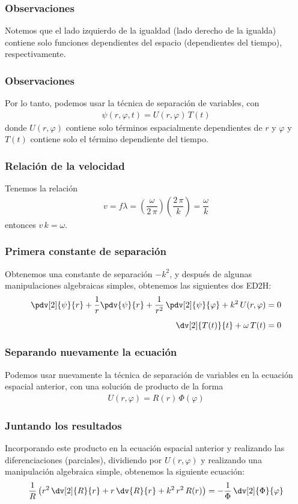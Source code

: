 \begin{frame}
\frametitle{Observaciones}
Notemos que el lado izquierdo de la igualdad (lado derecho de la igualda) contiene solo funciones dependientes del espacio (dependientes del tiempo), respectivamente.
\end{frame}
\begin{frame}
\frametitle{Observaciones}
Por lo tanto, podemos usar la técnica de separación de variables, con
\begin{align*}
\psi (r, \varphi, t) = U(r, \varphi) \, T(t)
\end{align*}
donde $U (r, \varphi)$ contiene solo términos espacialmente dependientes de $r$ y $\varphi$ y $T (t)$ contiene solo el término dependiente del tiempo.
\end{frame}
\begin{frame}
\frametitle{Relación de la velocidad}
Tenemos la relación
\begin{align*}
v = f \lambda = \left( \dfrac{\omega}{2 \, \pi} \right) \left( \dfrac{2 \, \pi}{k} \right) = \dfrac{\omega}{k}
\end{align*}
entonces $v \, k = \omega$.
\end{frame}
\begin{frame}
\frametitle{Primera constante de separación}
Obtenemos una constante de separación $-k^{2}$, y después de algunas manipulaciones algebraicas simples, obtenemos las siguientes dos ED2H:
\begin{align*}
\pdv[2]{\psi}{r} + \dfrac{1}{r} \pdv{\psi}{r} + \dfrac{1}{r^{2}} \, \pdv[2]{\psi}{\varphi} + k^{2} \, U(r, \varphi) &= 0\\[0.5em]
\dv[2]{T(t)}{t} + \omega \, T(t) &= 0
\end{align*}
\end{frame}
\begin{frame}
\frametitle{Separando nuevamente la ecuación}
Podemos usar nuevamente la técnica de separación de variables en la ecuación espacial anterior, con una solución de producto de la forma
\begin{align*}
U(r, \varphi) = R(r) \, \Phi (\varphi)
\end{align*}
\end{frame}
\begin{frame}
\frametitle{Juntando los resultados}
Incorporando este producto en la ecuación espacial anterior y realizando las diferenciaciones (parciales), dividiendo por $U(r, \varphi)$ y realizando una manipulación algebraica simple, obtenemos la siguiente ecuación:
\begin{align*}
\dfrac{1}{R} \left( r^{2} \, \dv[2]{R}{r} +  r \, \dv{R}{r} + k^{2} \, r^{2} \, R(r) \right) = - \dfrac{1}{\Phi} \, \dv[2]{\Phi}{\varphi}
\end{align*}
\end{frame}
